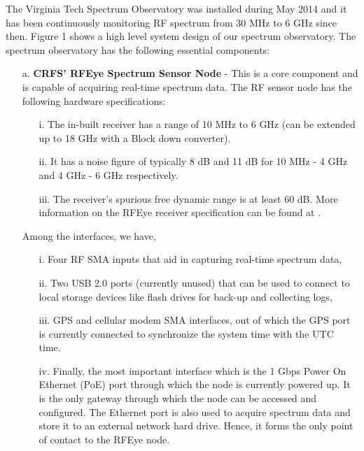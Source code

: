\documentclass[12pt,sts]{report}
\begin{document}
The Virginia Tech Spectrum Observatory was installed during May 2014 and it has been continuously monitoring RF spectrum from 30 MHz to 6 GHz since then. Figure 1 shows a high level system design of our spectrum observatory. The spectrum observatory has the following essential components:
\begin{enumerate}
	\item[a.] \textbf{CRFS' RFEye Spectrum Sensor Node} - This is a core component and is capable of acquiring real-time spectrum data. The RF sensor node has the following hardware specifications:
	\begin{enumerate}
		\item[i.] The in-built receiver has a range of 10 MHz to 6 GHz (can be extended up to 18 GHz with a Block down converter).
		\item[ii.] It has a noise figure of typically 8 dB and 11 dB for 10 MHz - 4 GHz and 4 GHz - 6 GHz respectively.
		\item[iii.] The receiver's spurious free dynamic range is at least 60 dB. More information on the RFEye receiver specification can be found at \cite{rfeye_specs}.
	\end{enumerate}
	Among the interfaces, we have, 
	\begin{enumerate}
		\item[i.] Four RF SMA inputs that aid in capturing real-time spectrum data, 
		\item[ii.] Two USB  2.0 ports (currently unused) that can be used to connect to local storage devices like flash drives for back-up and collecting logs, 
		\item[iii.] GPS and cellular modem SMA interfaces, out of which the GPS port is currently connected to synchronize the system time with the UTC time. 
		\item[iv.] Finally, the most important interface which is the 1 Gbps Power On Ethernet (PoE) port through which the node is currently powered up. It is the only gateway through which the node can be accessed and configured. The Ethernet port is also used to acquire spectrum data and store it to an external network hard drive. Hence, it forms the only point of contact to the RFEye node.
	\end{enumerate}
	

\end{enumerate}
\end{document}
